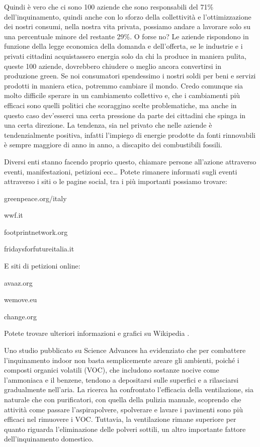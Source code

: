 \documentclass[12pt]{book} %
\begin{document}
Quindi è vero che ci sono 100 aziende che sono responsabili del 71\% dell'inquinamento, quindi
anche con lo sforzo della collettività e l'ottimizzazione dei nostri consumi, nella nostra vita
privata, possiamo andare a lavorare solo su una percentuale minore del restante 29\%. O forse no? Le aziende rispondono
in funzione della legge economica della domanda e dell'offerta, se le industrie e i privati
cittadini acquistassero energia solo da chi la produce in maniera pulita, queste 100 aziende, dovrebbero chiudere o
meglio ancora convertirsi in produzione green. Se noi consumatori
spendessimo i nostri soldi per beni e servizi prodotti in maniera etica, potremmo cambiare il mondo.
Credo comunque sia molto difficile sperare in un cambiamento collettivo e, che i cambiamenti più efficaci sono quelli politici che scoraggino scelte problematiche, ma anche in questo caso dev'esserci una certa pressione da parte dei cittadini che spinga in una certa direzione.
La tendenza, sia nel privato che nelle aziende è tendenzialmente positiva, infatti l'impiego di energie prodotte da fonti
rinnovabili è sempre maggiore di anno in anno, a discapito dei combustibili fossili.

Diversi enti stanno facendo proprio questo, chiamare persone all'azione attraverso eventi,
manifestazioni, petizioni ecc… Potete rimanere informati sugli eventi attraverso i siti o le pagine social, tra i più
importanti possiamo trovare:

greenpeace.org/italy

wwf.it

footprintnetwork.org

fridaysforfutureitalia.it 



E siti di petizioni online:

avaaz.org

wemove.eu

change.org


Potete trovare ulteriori informazioni e grafici su
Wikipedia
.


\begin{mdframed}[linewidth=1pt]
Uno studio pubblicato su Science Advances ha evidenziato che per combattere l’inquinamento indoor non basta semplicemente areare gli ambienti, poiché i composti organici volatili (VOC), che includono sostanze nocive come l’ammoniaca e il benzene, tendono a depositarsi sulle superfici e a rilasciarsi gradualmente nell’aria. La ricerca ha confrontato l’efficacia della ventilazione, sia naturale che con purificatori, con quella della pulizia manuale, scoprendo che attività come passare l’aspirapolvere, spolverare e lavare i pavimenti sono più efficaci nel rimuovere i VOC. Tuttavia, la ventilazione rimane superiore per quanto riguarda l’eliminazione delle polveri sottili, un altro importante fattore dell’inquinamento domestico.
\end{mdframed}
\end{document}
